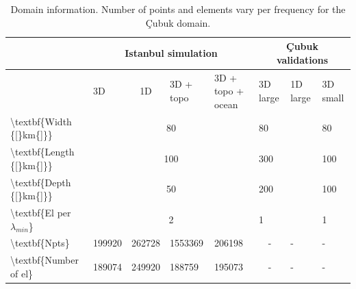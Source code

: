 \documentclass[../Text/00main.tex]{subfiles}
\begin{document}
\begin{table}[]
\caption{Domain information. Number of points and elements vary per frequency for the Çubuk domain. }
\begin{tabular}{@{}lcclllll@{}}
\toprule
 &
  \multicolumn{4}{c}{\textbf{Istanbul simulation}} &
  \multicolumn{3}{c}{\textbf{Çubuk validations}} \\ \midrule
\multicolumn{1}{l|}{} &
  \multicolumn{1}{l|}{3D} &
  \multicolumn{1}{c|}{1D} &
  \multicolumn{1}{l|}{3D + topo} &
  \multicolumn{1}{l|}{3D + topo + ocean} &
  \multicolumn{1}{l|}{3D large} &
  \multicolumn{1}{l|}{1D large} &
  3D small \\ \midrule
\multicolumn{1}{l|}{\textbackslash{}textbf\{Width \{{[}\}km\{{]}\}\}} &
  \multicolumn{4}{c|}{80} &
  \multicolumn{2}{l}{80} &
  80 \\
\multicolumn{1}{l|}{\textbackslash{}textbf\{Length \{{[}\}km\{{]}\}\}} &
  \multicolumn{4}{c|}{100} &
  \multicolumn{2}{l}{300} &
  100 \\
\multicolumn{1}{l|}{\textbackslash{}textbf\{Depth \{{[}\}km\{{]}\}\}} &
  \multicolumn{4}{c|}{50} &
  \multicolumn{2}{l}{200} &
  100 \\
\multicolumn{1}{l|}{\textbackslash{}textbf\{El per $\lambda_{min}$\}} &
  \multicolumn{4}{c|}{2} &
  \multicolumn{2}{l}{1} &
  1 \\
\multicolumn{1}{l|}{\textbackslash{}textbf\{Npts\}} &
  \multicolumn{1}{l}{199920} &
  262728 &
  1553369 &
  \multicolumn{1}{l|}{206198} &
  \multicolumn{1}{c}{-} &
  - &
  - \\
\multicolumn{1}{l|}{\textbackslash{}textbf\{Number of el\}} &
  \multicolumn{1}{l}{189074} &
  249920 &
  188759 &
  \multicolumn{1}{l|}{195073} &
  \multicolumn{1}{c}{-} &
  - &
  - \\ \bottomrule
\end{tabular}
\end{table}
\end{document}
